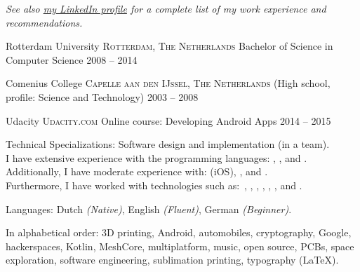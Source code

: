 \documentclass[10pt,a4paper]{article}
\begin{document}
\begin{center}
  \emph{See also \href{http://www.linkedin.com/in/frankkie12345}{my LinkedIn profile} for a complete list of my work experience and recommendations.}
\end{center}



\spacedhrule{-0.2em}{-0.4em}


\headedsection
  {Rotterdam University}
  {\textsc{Rotterdam, The Netherlands}} {%
  \headedsubsection
    {Bachelor of Science in Computer Science}
    {2008 -- 2014}
    {}
}

\headedsection
  {Comenius College}
  {\textsc{Capelle aan den IJssel, The Netherlands}} {%
  \headedsubsection
    { \textnormal{(High school, profile: Science and Technology)}}
    {2003 -- 2008} {}
}

\headedsection
  {Udacity}
  {\textsc{Udacity.com}} {
  \headedsection
  { \textnormal{Online course: Developing Android Apps}}
  {2014 -- 2015} 
  {}
  }

\spacedhrule{0.5em}{-0.4em}


\inlineheadsection  %
  {Technical Specializations:}
  {Software design and implementation (in a team). \\
  I have extensive experience with the programming languages: , , and . \\
  Additionally, I have moderate experience with:  (iOS), , and . \\
  Furthermore, I have worked with technologies such as:\ , , , , , , and .}

\inlineheadsection
  {Languages:}
  {Dutch \emph{(Native)}, English \emph{(Fluent)}, German \emph{(Beginner)}.}


\spacedhrule{1.6em}{-0.4em}


\inlineheadsection
  {In alphabetical order:}
  {3D printing, Android, automobiles, cryptography, Google, hackerspaces, Kotlin, MeshCore, multiplatform, music, open source, PCBs, space exploration, software engineering, sublimation printing, typography (\LaTeX).}
\end{document}
